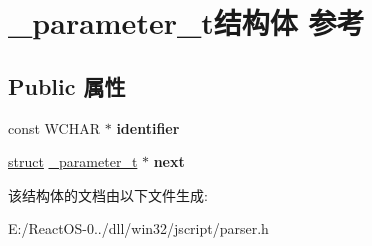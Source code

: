 \hypertarget{struct__parameter__t}{}\section{\+\_\+parameter\+\_\+t结构体 参考}
\label{struct__parameter__t}
\subsection*{Public 属性}
\begin{DoxyCompactItemize}
\item 
\mbox{\label{struct__parameter__t_a680fb6706c15775b3c2dade20f891532}} 
const W\+C\+H\+AR $\ast$ {\bfseries identifier}
\item 
\mbox{\label{struct__parameter__t_a38ae3fa9521cc68a284259b4b84c4f07}} 
\hyperlink{interfacestruct}{struct} \hyperlink{struct__parameter__t}{\+\_\+parameter\+\_\+t} $\ast$ {\bfseries next}
\end{DoxyCompactItemize}


该结构体的文档由以下文件生成\+:\begin{DoxyCompactItemize}
\item 
E\+:/\+React\+O\+S-\/0../dll/win32/jscript/parser.\+h\end{DoxyCompactItemize}
